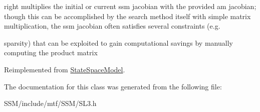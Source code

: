 right multiplies the initial or current ssm jacobian with the provided am jacobian; though this can be accomplished by the search method itself with simple matrix multiplication, the ssm jacobian often satisfies several constraints (e.\-g. 

sparsity) that can be exploited to gain computational savings by manually computing the product matrix 

Reimplemented from \hyperlink{classStateSpaceModel_ac956c679581e746891c62755fe715b3b}{State\-Space\-Model}.



The documentation for this class was generated from the following file\-:\begin{DoxyCompactItemize}
\item 
S\-S\-M/include/mtf/\-S\-S\-M/S\-L3.\-h\end{DoxyCompactItemize}
